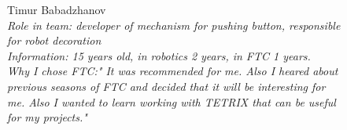 \begin{figure}[H]
	\begin{minipage}[h]{0.47\linewidth}
		Timur Babadzhanov\\
		\emph{Role in team: developer of mechanism for pushing button, responsible for robot decoration\\ }
		\emph{Information: 15 years old, in robotics 2 years, in FTC 1 years. \\ } 
		\emph{Why I chose FTC:" It was recommended for me. Also I heared about previous seasons of FTC and decided that it will be interesting for me. Also I wanted to learn working with TETRIX that can be useful for my projects."}					
	\end{minipage}
	\hfill
	\begin{minipage}[h]{0.47\linewidth}
		\\
	\end{minipage}
\end{figure}
\hfill

